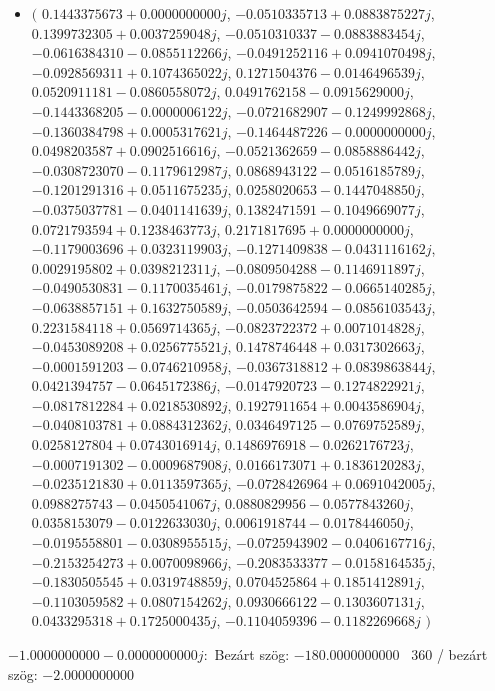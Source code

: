 \documentclass[14pt,a4paper]{article}
\begin{document}
\begin{itemize}
\item
$\big($
$0.1443375673+0.0000000000j$, $-0.0510335713+0.0883875227j$, $0.1399732305+0.0037259048j$, $-0.0510310337-0.0883883454j$, $-0.0616384310-0.0855112266j$, $-0.0491252116+0.0941070498j$, $-0.0928569311+0.1074365022j$, $0.1271504376-0.0146496539j$, $0.0520911181-0.0860558072j$, $0.0491762158-0.0915629000j$, $-0.1443368205-0.0000006122j$, $-0.0721682907-0.1249992868j$, $-0.1360384798+0.0005317621j$, $-0.1464487226-0.0000000000j$, $0.0498203587+0.0902516616j$, $-0.0521362659-0.0858886442j$, $-0.0308723070-0.1179612987j$, $0.0868943122-0.0516185789j$, $-0.1201291316+0.0511675235j$, $0.0258020653-0.1447048850j$, $-0.0375037781-0.0401141639j$, $0.1382471591-0.1049669077j$, $0.0721793594+0.1238463773j$, $0.2171817695+0.0000000000j$, $-0.1179003696+0.0323119903j$, $-0.1271409838-0.0431116162j$, $0.0029195802+0.0398212311j$, $-0.0809504288-0.1146911897j$, $-0.0490530831-0.1170035461j$, $-0.0179875822-0.0665140285j$, $-0.0638857151+0.1632750589j$, $-0.0503642594-0.0856103543j$, $0.2231584118+0.0569714365j$, $-0.0823722372+0.0071014828j$, $-0.0453089208+0.0256775521j$, $0.1478746448+0.0317302663j$, $-0.0001591203-0.0746210958j$, $-0.0367318812+0.0839863844j$, $0.0421394757-0.0645172386j$, $-0.0147920723-0.1274822921j$, $-0.0817812284+0.0218530892j$, $0.1927911654+0.0043586904j$, $-0.0408103781+0.0884312362j$, $0.0346497125-0.0769752589j$, $0.0258127804+0.0743016914j$, $0.1486976918-0.0262176723j$, $-0.0007191302-0.0009687908j$, $0.0166173071+0.1836120283j$, $-0.0235121830+0.0113597365j$, $-0.0728426964+0.0691042005j$, $0.0988275743-0.0450541067j$, $0.0880829956-0.0577843260j$, $0.0358153079-0.0122633030j$, $0.0061918744-0.0178446050j$, $-0.0195558801-0.0308955515j$, $-0.0725943902-0.0406167716j$, $-0.2153254273+0.0070098966j$, $-0.2083533377-0.0158164535j$, $-0.1830505545+0.0319748859j$, $0.0704525864+0.1851412891j$, $-0.1103059582+0.0807154262j$, $0.0930666122-0.1303607131j$, $0.0433295318+0.1725000435j$, $-0.1104059396-0.1182269668j$
$\big)$
\end{itemize}
$-1.0000000000-0.0000000000j$:\
Bezárt szög: $-180.0000000000$ \
360 / bezárt szög: $-2.0000000000$\
\end{document}
